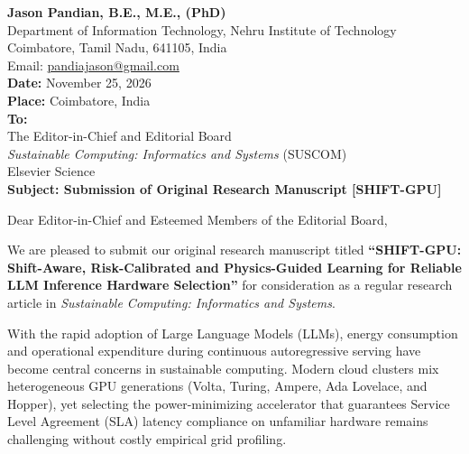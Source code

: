 \documentclass[11pt]{article}
\begin{document}
\noindent
\textbf{Jason Pandian, B.E., M.E., (PhD)}\\
Department of Information Technology, Nehru Institute of Technology\\
Coimbatore, Tamil Nadu, 641105, India\\
Email: \url{pandiajason@gmail.com}\\[1em]
\textbf{Date:} November 25, 2026\\
\textbf{Place:} Coimbatore, India\\[1em]
\textbf{To:}\\
The Editor-in-Chief and Editorial Board\\
\textit{Sustainable Computing: Informatics and Systems} (SUSCOM)\\
Elsevier Science\\[1em]
\textbf{Subject: Submission of Original Research Manuscript [SHIFT-GPU]}

\vspace{1em}
\noindent
Dear Editor-in-Chief and Esteemed Members of the Editorial Board,

We are pleased to submit our original research manuscript titled \textbf{``SHIFT-GPU: Shift-Aware, Risk-Calibrated and Physics-Guided Learning for Reliable LLM Inference Hardware Selection''} for consideration as a regular research article in \textit{Sustainable Computing: Informatics and Systems}.

With the rapid adoption of Large Language Models (LLMs), energy consumption and operational expenditure during continuous autoregressive serving have become central concerns in sustainable computing. Modern cloud clusters mix heterogeneous GPU generations (Volta, Turing, Ampere, Ada Lovelace, and Hopper), yet selecting the power-minimizing accelerator that guarantees Service Level Agreement (SLA) latency compliance on unfamiliar hardware remains challenging without costly empirical grid profiling.
\end{document}
